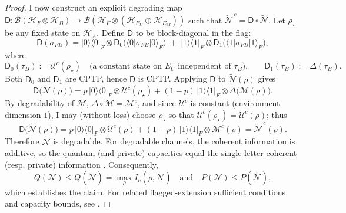 \documentclass[11pt]{article}
\theoremstyle{plain}
\theoremstyle{definition}
\numberwithin{equation}{section}
\begin{document}
\begin{proof}
I now construct an explicit degrading map $\mathsf D:\mathcal B(\mathcal H_F\!\otimes\!\mathcal H_B)\!\to\!\mathcal B(\mathcal H_F\!\otimes\!(\mathcal H_{E_U}\oplus\mathcal H_{E_M}))$ such that
$\widetilde{\mathcal N}^{\,c}=\mathsf D\circ \widetilde{\mathcal N}$.
Let $\rho_\star$ be any fixed state on $\mathcal H_A$. Define $\mathsf D$ to be block-diagonal in the flag:
\[
\mathsf D(\sigma_{FB}) = 
|0\rangle\!\langle 0|_F \otimes \mathsf D_0\!\big(\langle 0|\sigma_{FB}|0\rangle_F\big)
\;+\;
|1\rangle\!\langle 1|_F \otimes \mathsf D_1\!\big(\langle 1|\sigma_{FB}|1\rangle_F\big),
\]
where
\[
\mathsf D_0(\tau_B) := \mathcal U^c(\rho_\star)\quad\text{(a constant state on $E_U$ independent of $\tau_B$),}
\qquad
\mathsf D_1(\tau_B) := \Delta(\tau_B).
\]
Both $\mathsf D_0$ and $\mathsf D_1$ are CPTP, hence $\mathsf D$ is CPTP. Applying $\mathsf D$ to $\widetilde{\mathcal N}(\rho)$ gives
\[
\mathsf D\!\big(\widetilde{\mathcal N}(\rho)\big)
= p\,|0\rangle\!\langle 0|_F\!\otimes\!\mathcal U^c(\rho_\star)
  + (1-p)\,|1\rangle\!\langle 1|_F\!\otimes\!\Delta\!\big(\mathcal M(\rho)\big).
\]
By degradability of $\mathcal M$, $\Delta\circ\mathcal M=\mathcal M^c$, and since $\mathcal U^c$ is constant (environment dimension $1$), I may (without loss) choose $\rho_\star$ so that $\mathcal U^c(\rho_\star)=\mathcal U^c(\rho)$; thus
\[
\mathsf D\!\big(\widetilde{\mathcal N}(\rho)\big)
= p\,|0\rangle\!\langle 0|_F\!\otimes\!\mathcal U^c(\rho)
  + (1-p)\,|1\rangle\!\langle 1|_F\!\otimes\!\mathcal M^c(\rho)
= \widetilde{\mathcal N}^{\,c}(\rho).
\]
Therefore $\widetilde{\mathcal N}$ is degradable. For degradable channels, the coherent information is additive, so the quantum (and private) capacities equal the single-letter coherent (resp. private) information \cite{CubittRuskaiSmith2008,Wilde2017QIT}. Consequently,
\[
Q(\mathcal N)\le Q(\widetilde{\mathcal N})=\max_{\rho} I_c(\rho,\widetilde{\mathcal N})
\quad\text{and}\quad
P(\mathcal N)\le P(\widetilde{\mathcal N}),
\]
which establishes the claim. For related flagged-extension sufficient conditions and capacity bounds, see \cite{77}.
\end{proof}
\end{document}
